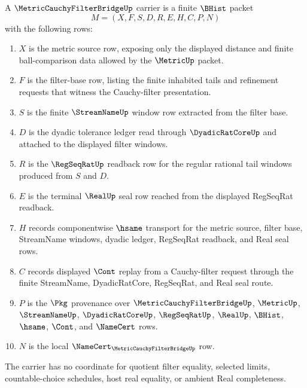 \begin{definition}
\label{def:metric-cauchy-filter-bridge-carrier}
A $\MetricCauchyFilterBridgeUp$ carrier is a finite $\BHist$ packet
$$
M=(X,F,S,D,R,E,H,C,P,N)
$$
with the following rows:
\begin{enumerate}
\item $X$ is the metric source row, exposing only the displayed distance and finite ball-comparison data allowed by the $\MetricUp$ packet.
\item $F$ is the filter-base row, listing the finite inhabited tails and refinement requests that witness the Cauchy-filter presentation.
\item $S$ is the finite $\StreamNameUp$ window row extracted from the filter base.
\item $D$ is the dyadic tolerance ledger read through $\DyadicRatCoreUp$ and attached to the displayed filter windows.
\item $R$ is the $\RegSeqRatUp$ readback row for the regular rational tail windows produced from $S$ and $D$.
\item $E$ is the terminal $\RealUp$ seal row reached from the displayed RegSeqRat readback.
\item $H$ records componentwise $\hsame$ transport for the metric source, filter base, StreamName windows, dyadic ledger, RegSeqRat readback, and Real seal rows.
\item $C$ records displayed $\Cont$ replay from a Cauchy-filter request through the finite StreamName, DyadicRatCore, RegSeqRat, and Real seal route.
\item $P$ is the $\Pkg$ provenance over $\MetricCauchyFilterBridgeUp$, $\MetricUp$, $\StreamNameUp$, $\DyadicRatCoreUp$, $\RegSeqRatUp$, $\RealUp$, $\BHist$, $\hsame$, $\Cont$, and $\NameCert$ rows.
\item $N$ is the local $\NameCert_{\MetricCauchyFilterBridgeUp}$ row.
\end{enumerate}
The carrier has no coordinate for quotient filter equality, selected limits, countable-choice schedules, host real equality, or ambient Real completeness.
\end{definition}


